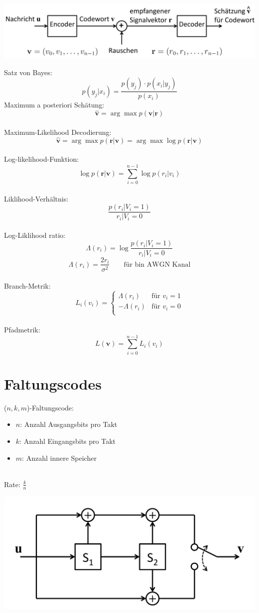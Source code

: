 \begin{center}
	\includegraphics[width=.9\textwidth]{../fig/optdecode.png}
\end{center}
Satz von Bayes:
\[ p(y_j|x_i) = \frac{p(y_j) \cdot p(x_i|y_j)}{p(x_i)} \]
Maximum a posteriori Schätung:
\[ \hat{\textbf{v}} = \arg\max p(\textbf{v}|\textbf{r}) \]
~\\
Maximum-Likelihood Decodierung:
\[ \hat{\textbf{v}} = \arg\max p(\textbf{r}|\textbf{v}) =
	\arg\max\log p(\textbf{r}|\textbf{v}) \]
~\\
Log-likelihood-Funktion:
\[ \log p(\textbf{r}|\textbf{v}) = \sum_{i=0}^{n-1} \log p(r_i|v_i) \]
~\\
Liklihood-Verhältnis:
\[ \frac{p(r_i|V_i=1)}{r_i|V_i=0} \]
~\\
Log-Liklihood ratio:
\[ \Lambda(r_i) = \log\frac{p(r_i|V_i=1)}{r_i|V_i=0} \]
\[ \Lambda(r_i) = \frac{2r_i}{\sigma^2} \qquad \textrm{für bin AWGN Kanal}\]
~\\
Branch-Metrik:
\[ L_i(v_i) = \left\lbrace \begin{matrix}
		\Lambda(r_i)  & \textrm{für } v_i=1\\
		-\Lambda(r_i) & \textrm{für } v_i=0\\
	\end{matrix} \right. \]
~\\
Pfadmetrik:
\[ L(\textbf{v}) = \sum_{i=0}^{n-1}L_i(v_i) \]

\section{Faltungscodes}
($n,k,m$)-Faltungscode:
\begin{itemize}
	\item $n$: Anzahl Ausgangsbits pro Takt
	\item $k$: Anzahl Eingangsbits pro Takt
	\item $m$: Anzahl innere Speicher
\end{itemize}
~\\
Rate: $\frac{k}{n}$

\begin{center}
	\includegraphics[width=.9\textwidth]{../fig/faltungscode.png}
\end{center}

